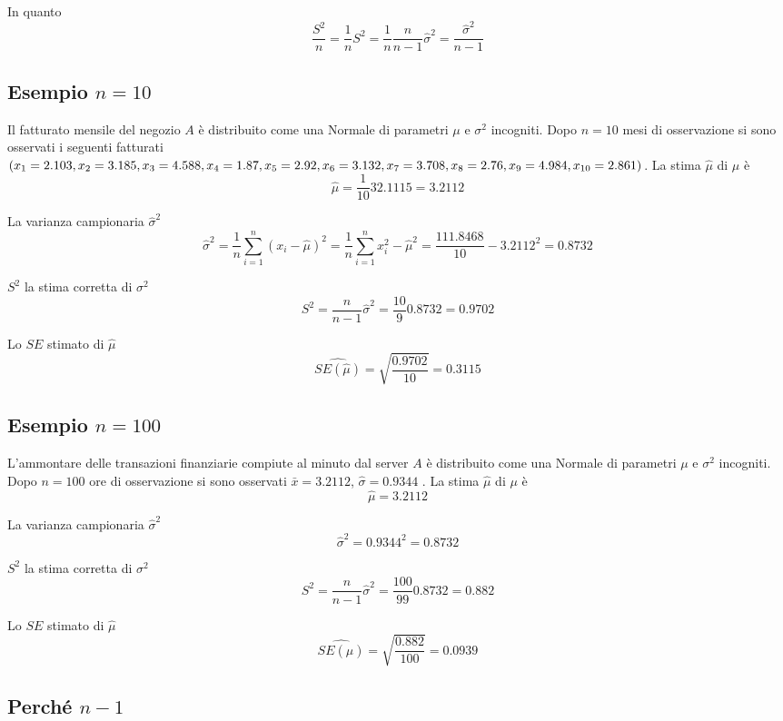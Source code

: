 \documentclass[
  11pt,
]{book}
\theoremstyle{mytheoremstyle}
\theoremstyle{mydefstyle}
\begin{document}
In quanto
\[\frac {S^2}{n}=\frac 1 nS^2=\frac 1 n \frac{n}{n-1}\hat\sigma^2=\frac{\hat\sigma^2}{n-1}\]

\subsection{\texorpdfstring{Esempio \(n=10\)}{Esempio n=10}}\label{esempio-n10}

Il fatturato mensile del negozio \(A\) è distribuito come una Normale di parametri \(\mu\) e \(\sigma^2\) incogniti. Dopo \(n=10\) mesi di osservazione si sono osservati i seguenti fatturati \(\small (x_{1}=2.103, x_{2}=3.185, x_{3}=4.588, x_{4}=1.87, x_{5}=2.92, x_{6}=3.132, x_{7}=3.708, x_{8}=2.76, x_{9}=4.984, x_{10}=2.861)\).
La stima \(\hat\mu\) di \(\mu\) è
\[\hat\mu=\frac 1 {10}32.1115=3.2112\]

La varianza campionaria \(\hat\sigma^2\)
\[\hat\sigma^2=\frac 1 n \sum_{i=1}^n(x_i-\hat\mu)^2=\frac 1 n \sum_{i=1}^n x_i^2-\hat\mu^2=\frac{111.8468}{10}-3.2112^2=0.8732\]

\(S^2\) la stima corretta di \(\sigma^2\)
\[S^2=\frac{n}{n-1}\hat\sigma^2=\frac{10}{9}0.8732=0.9702\]

Lo \(SE\) stimato di \(\hat\mu\)
\[\widehat{SE(\hat\mu)} = 
  \sqrt{\frac{0.9702}{10}} =
  0.3115\]

\subsection{\texorpdfstring{Esempio \(n=100\)}{Esempio n=100}}\label{esempio-n100}

L'ammontare delle transazioni finanziarie compiute al minuto dal server \(A\) è distribuito come una Normale di parametri \(\mu\) e \(\sigma^2\) incogniti. Dopo \(n=100\) ore di osservazione si sono osservati \(\bar x=3.2112\), \(\hat\sigma=0.9344\) .
La stima \(\hat\mu\) di \(\mu\) è
\[\hat\mu=3.2112\]

La varianza campionaria \(\hat\sigma^2\)
\[\hat\sigma^2=0.9344^2=0.8732\]

\(S^2\) la stima corretta di \(\sigma^2\)
\[S^2=\frac{n}{n-1}\hat\sigma^2=\frac{100}{99}0.8732=0.882\]

Lo \(SE\) stimato di \(\hat\mu\)
\[\widehat{SE(\hat\mu)} = 
  \sqrt{\frac{0.882}{100}} =
  0.0939\]

\subsection{\texorpdfstring{Perché \(n-1\)}{Perché n-1}}\label{perchuxe9-n-1}
\end{document}
